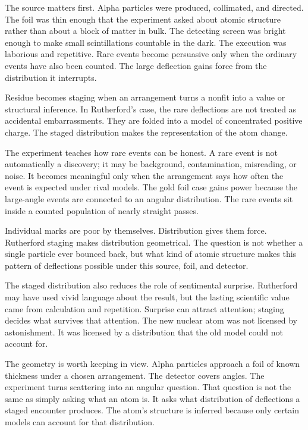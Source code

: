 The source matters first. Alpha particles were produced, collimated, and
directed. The foil was thin enough that the experiment asked about atomic
structure rather than about a block of matter in bulk. The detecting screen
was bright enough to make small scintillations countable in the dark. The
execution was laborious and repetitive. Rare events become persuasive only
when the ordinary events have also been counted. The large deflection gains
force from the distribution it interrupts.

Residue becomes staging when an arrangement turns a nonfit into a value or
structural inference. In Rutherford's case, the rare deflections are not
treated as accidental embarrassments. They are folded into a model of
concentrated positive charge. The staged distribution makes the
representation of the atom change.

The experiment teaches how rare events can be honest. A rare event is not
automatically a discovery; it may be background, contamination, misreading,
or noise. It becomes meaningful only when the arrangement says how often
the event is expected under rival models. The gold foil case gains power
because the large-angle events are connected to an angular distribution.
The rare events sit inside a counted population of nearly straight passes.

Individual marks are poor by themselves. Distribution gives them force.
Rutherford staging makes distribution geometrical. The question is not
whether a single particle ever bounced back, but what kind of atomic
structure makes this pattern of deflections possible under this source,
foil, and detector.

The staged distribution also reduces the role of sentimental surprise.
Rutherford may have used vivid language about the result, but the lasting
scientific value came from calculation and repetition. Surprise can attract
attention; staging decides what survives that attention. The new nuclear
atom was not licensed by astonishment. It was licensed by a distribution
that the old model could not account for.

The geometry is worth keeping in view. Alpha particles approach a foil of
known thickness under a chosen arrangement. The detector covers angles. The
experiment turns scattering into an angular question. That question is not
the same as simply asking what an atom is. It asks what distribution of
deflections a staged encounter produces. The atom's structure is inferred
because only certain models can account for that distribution.

